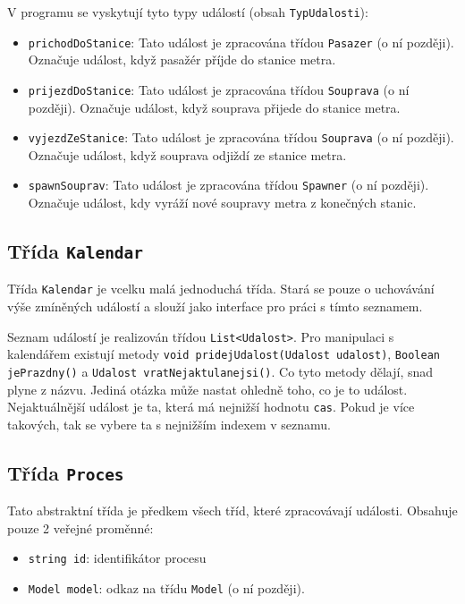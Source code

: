 \documentclass[12pt, a4paper]{article}
\begin{document}
V programu se vyskytují tyto typy událostí (obsah \texttt{TypUdalosti}):
\begin{itemize}
    \item \texttt{prichodDoStanice}: Tato událost je zpracována třídou \texttt{Pasazer} (o ní později). Označuje událost, když pasažér příjde do stanice metra.
    \item \texttt{prijezdDoStanice}: Tato událost je zpracována třídou \texttt{Souprava} (o ní později). Označuje událost, když souprava přijede do stanice metra.
    \item \texttt{vyjezdZeStanice}: Tato událost je zpracována třídou \texttt{Souprava} (o ní později). Označuje událost, když souprava odjiždí ze stanice metra.
    \item \texttt{spawnSouprav}: Tato událost je zpracována třídou \texttt{Spawner} (o ní později). Označuje událost, kdy vyráží nové soupravy metra z konečných stanic.
\end{itemize}

\subsection{Třída \texttt{Kalendar}}
Třída \texttt{Kalendar} je vcelku malá jednoduchá třída. Stará se pouze o uchovávání výše zmíněných událostí a slouží jako interface pro práci s tímto seznamem.

Seznam událostí je realizován třídou \texttt{List<Udalost>}. Pro manipulaci s kalendářem existují metody \texttt{void pridejUdalost(Udalost udalost)}, \texttt{Boolean jePrazdny()} a \texttt{Udalost vratNejaktulanejsi()}. Co tyto metody dělají, snad plyne z názvu. Jediná otázka může nastat ohledně toho, co je to  událost. Nejaktuálnější událost je ta, která má nejnižší hodnotu \texttt{cas}. Pokud je více takových, tak se vybere ta s nejnižším indexem v seznamu.

\subsection{Třída \texttt{Proces}}
Tato abstraktní třída je předkem všech tříd, které zpracovávají události. Obsahuje pouze 2 veřejné proměnné:
\begin{itemize}
    \item \texttt{string id}: identifikátor procesu
    \item \texttt{Model model}: odkaz na třídu \texttt{Model} (o ní později).
\end{itemize}
\end{document}
